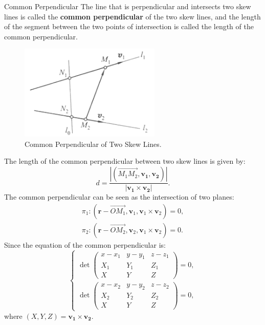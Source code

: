\documentclass[11pt]{../../TexTemplate/elegantbook} %
\begin{document}
\begin{definition}{Common Perpendicular}
    The line that is perpendicular and intersects two skew lines is called 
    the \textbf{common perpendicular} of the two skew lines, 
    and the length of the segment between the two points of intersection is called the length of the common perpendicular.    
\end{definition}
\begin{figure}[h]
    \centering
    \includegraphics[width=0.6\textwidth]{img/CommonPerp.png}
    \caption{Common Perpendicular of Two Skew Lines.}
    \label{fig:CommonPerpendicular}
\end{figure}
The length of the common perpendicular between two skew lines is given by:
\[
d = \frac{|(\vec{M_{1}M_{2}}, \mathbf{v_{1}}, \mathbf{v_{2}})|}{|\mathbf{v_{1}} \times \mathbf{v_{2}}|}.
\]
The common perpendicular can be seen as the intersection of two planes:
\begin{gather*}
    \pi_{1}: (\mathbf{r} - \vec{OM_{1}}, \mathbf{v}_{1}, \mathbf{v}_{1}\times \mathbf{v}_{2}) = 0, \\
    \pi_{2}: (\mathbf{r} - \vec{OM_{2}}, \mathbf{v}_{2}, \mathbf{v}_{1}\times \mathbf{v}_{2}) = 0.
\end{gather*}
Since the equation of the common perpendicular is:
\[
\begin{cases} \det\begin{pmatrix}x-x_{1}&y-y_{1}&z-z_{1}\\X_{1}&Y_{1}&Z_{1}\\X&Y&Z\end{pmatrix}=0,  \\ 
    \det\begin{pmatrix}x-x_{2}&y-y_{2}&z-z_{2}\\X_{2}&Y_{2}&Z_{2}\\X&Y&Z\end{pmatrix}=0,
\end{cases}
\]
where \((X, Y, Z) = \mathbf{v_{1}} \times \mathbf{v_{2}}\).
\end{document}
